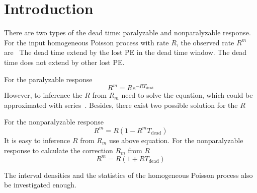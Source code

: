 \section{Introduction}
There are two types of the dead time: paralyzable and nonparalyzable response. For the input homogeneous Poisson process with rate $R$, the observed rate $R^m$ are~\cite{muller19942} 
	The dead time extend by the lost PE in the dead time window.
	The dead time does not extend by other lost PE.

For the paralyzable response
\begin{equation}
	R^m=Re^{-RT_\mathrm{dead}}
\end{equation}
However, to inference the $R$ from $R_m$ need to solve the equation, which could be approximated with series~\cite{muller19942}. Besides, there exist two possible solution for the $R$

For the nonparalyzable response
\begin{equation}
	R^m=R(1-R^mT_\mathrm{dead})
\end{equation}
It is easy to inference $R$ from $R_m$ use above equation.
For the nonparalyzable response to calculate the correction $R_m$ from $R$
\begin{equation}
	R^m=R(1+RT_\mathrm{dead})
\end{equation}

The interval densities and the statistics of the homogeneous Poisson process also be investigated enough.
